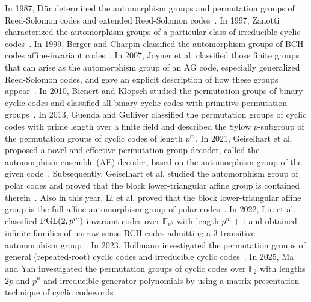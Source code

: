 \documentclass[journal,12pt,onecolumn]{IEEEtran}
\begin{document}
In 1987, D{\"u}r determined the automorphism groups and permutation groups of Reed-Solomon codes and extended Reed-Solomon codes~\cite{DUR198769}. In 1997, Zanotti characterized the automorphism groups of a particular class of irreducible cyclic codes~\cite{ZANOTTI1997303}. In 1999, Berger and Charpin classified the automorphism groups of BCH codes affine-invariant codes~\cite{bergerAutomorphismGroupsBCH1999}. In 2007, Joyner et al. classified those finite groups that can arise as the automorphism group of an AG code, especially generalized Reed-Solomon codes, and gave an explicit description of how these groups appear~\cite{doi:10.1142/9789812772022_0008}. In 2010, Bienert and Klopsch studied the permutation groups of binary cyclic codes and classified all binary cyclic codes with primitive permutation groups~\cite{bienertAutomorphismGroupsCyclic2010}. In 2013, Guenda and Gulliver classified the permutation groups of cyclic codes with prime length  over a finite field and described the Sylow $p$-subgroup of the permutation groups of cyclic codes of length $p^m$. In 2021, Geiselhart et al. proposed a novel and effective permutation group decoder, called the automorphism ensemble (AE) decoder, based on the automorphism group of the given code~\cite{9492151}. Subsequently, Geiselhart et al. studied the automorphism group of polar codes and proved that the block lower-triangular affine group is contained therein~\cite{9518184}. Also in this year, Li et al. proved that the block lower-triangular affine group is the full affine automorphism group of polar codes~\cite{9685181}. In 2022, Liu et al. classified ${\rm PGL}(2,p^m)$-invariant codes over $\mathbb{F}_{p^h}$ with length $p^m+1$ and obtained infinite families of narrow-sense BCH codes admitting a $3$-transitive automorphism group~\cite{9666868}. In 2023, Hollmann investigated the permutation groups of general (repeated-root) cyclic codes and irreducible cyclic codes~\cite{HOLLMANN2023102146}. In 2025, Ma and Yan investigated the permutation groups of cyclic codes over $\mathbb{F}_2$ with lengths $2p$ and $p^n$ and irreducible generator polynomials by using a matrix presentation technique of cyclic codewords~\cite{maAutomorphismGroupsBinary2025}. 
\end{document}
